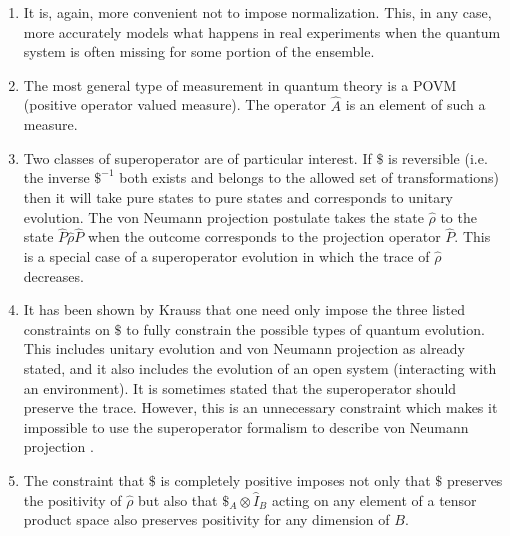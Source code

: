 \documentclass[10pt,twocolumn]{article}
\begin{document}
\begin{enumerate}
\item It is, again, more convenient not to impose normalization. This,
in any case, more accurately models what happens in real experiments when
the quantum system is often missing for some portion of the ensemble.
\item The most general type of measurement in quantum theory is a POVM
(positive operator valued measure).  The operator $\hat{A}$ is an
element of such a measure.
\item Two classes of superoperator are of particular interest.  If $\$ $
is reversible (i.e. the inverse $\$^{-1} $ both exists and belongs to
the allowed set of transformations)
then it will take pure states to pure states and
corresponds to unitary evolution.  The von Neumann projection
postulate takes the state $\hat{\rho}$ to the state
$\hat{P}\hat{\rho}\hat{P}$ when the outcome corresponds to the
projection operator $\hat{P}$.  This is a special case of a
superoperator evolution in which the trace of $\hat{\rho}$
decreases.
\item It has been shown by Krauss \cite{krauss} that one need only
impose the three
listed constraints on $\$ $ to fully constrain the possible types of quantum
evolution.  This includes unitary evolution and von Neumann projection
as already stated, and it also includes the evolution of an open system
(interacting with an environment). It is sometimes stated that the
superoperator should preserve the trace.  However, this is an
unnecessary constraint which makes it impossible to use the superoperator
formalism to describe von Neumann projection \cite{Nielsenchuang}.
\item The constraint that $\$ $ is completely positive imposes  not only
that $\$ $ preserves the positivity of $\hat{\rho}$ but also
that $ \$_A\otimes\hat{I}_B$ acting on any element of a tensor product
space also preserves positivity for any dimension of $B$.
\end{enumerate}
\end{document}
